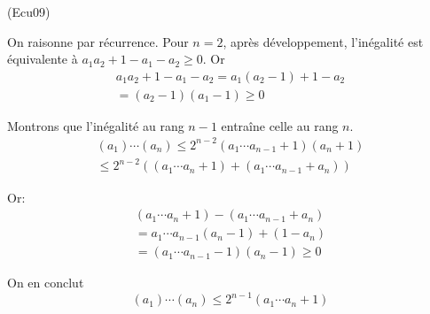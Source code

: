 \begin{tiny}(Ecu09)\end{tiny} On raisonne par récurrence.\newline
Pour $n=2$, après développement, l'inégalité est équivalente à $a_1a_2+1-a_1-a_2 \geq 0$. Or 
\begin{multline*}
 a_1a_2+1-a_1-a_2 = a_1(a_2 -1) + 1-a_2 \\ = (a_2-1)(a_1-1)\geq 0
\end{multline*}

Montrons que l'inégalité au rang $n-1$ entraîne celle au rang $n$.
\begin{multline*}
(a_1)\cdots (a_n) \leq 2^{n-2}(a_1\cdots a_{n-1} + 1)(a_n+1)\\
\leq 2^{n-2}\left( (a_1\cdots a_{n} + 1) + (a_1\cdots a_{n-1} + a_n)\right) 
\end{multline*}

Or:
\begin{multline*}
(a_1\cdots a_{n} + 1) - (a_1\cdots a_{n-1} + a_n)\\
= a_1\cdots a_{n-1}(a_n -1) + (1-a_n) \\
= (a_1\cdots a_{n-1} -1)(a_n -1)\geq 0
\end{multline*}

On en conclut
\begin{displaymath}
(a_1)\cdots (a_n) \leq 2^{n-1}(a_1\cdots a_{n} + 1)  
\end{displaymath}
